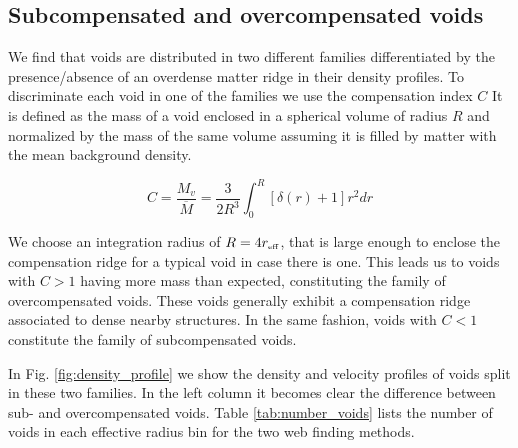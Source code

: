 \documentclass[a4,useAMS,usenatbib,usegraphicx]{mn2e}
\newcommand{\eq}[2]{\begin{equation} \label{eq:#1} #2 \end{equation}}
\newcommand{\reff}{{\ifmmode{r_{\mbox{\tiny eff}}}\else{$r_{\mbox{\tiny eff}}$}\fi}}
\begin{document}
\subsection{Subcompensated and overcompensated voids}
\label{subsec:enclosedmass}

We find that voids are distributed in two different families
differentiated by the 
presence/absence of an overdense matter ridge in their density
profiles. 
To discriminate each void in one of the families we use the
compensation  index $C$
It is defined as the mass of a void enclosed in a spherical volume of
radius $R$ and normalized by the mass of the same volume assuming
it is filled by matter with the mean background density.

\eq{compensation}
{C= \frac{M_v}{\overline{M}} = \frac{3}{2R^{3}} \int_0^{R} [\delta(r) + 1] r^2 dr}

We choose an integration radius of $R=4\reff$, that is large enough to 
enclose the compensation ridge for a typical void in case there is one. 
This leads us to voids with $C>1$ having more mass than expected, 
constituting the family of overcompensated voids. 
These voids generally  exhibit a compensation ridge associated to
dense nearby structures. 
In the same fashion, voids with $C<1$ constitute the family
of  subcompensated voids. 

In Fig. \ref{fig:density_profile} we show the density and velocity profiles
of voids split in these two families. 
In the left column it becomes clear the difference between sub- and
overcompensated voids. 
Table \ref{tab:number_voids} lists the number of voids in 
each effective radius bin for the two web finding methods.
\end{document}

